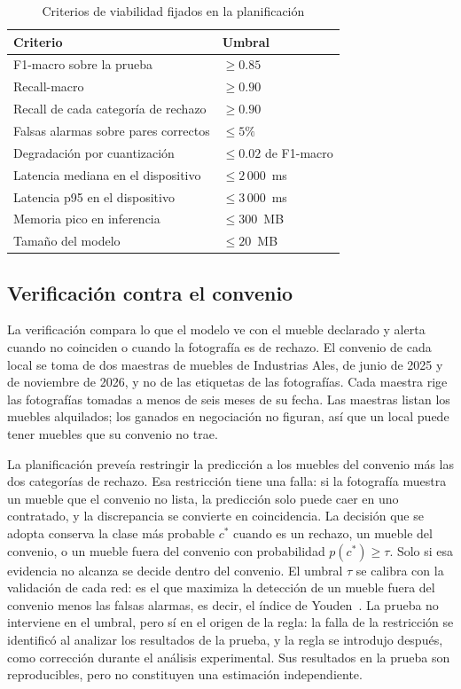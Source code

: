 \documentclass[conference]{IEEEtran}
\begin{document}
\begin{table}[t]
\caption{Criterios de viabilidad fijados en la planificación}
\label{tab:criterios}
\centering
\begin{tabular}{@{}ll@{}}
\toprule
Criterio & Umbral \\
\midrule
F1-macro sobre la prueba & $\geq 0.85$ \\
Recall-macro & $\geq 0.90$ \\
Recall de cada categoría de rechazo & $\geq 0.90$ \\
Falsas alarmas sobre pares correctos & $\leq 5\%$ \\
Degradación por cuantización & $\leq 0.02$ de F1-macro \\
Latencia mediana en el dispositivo & $\leq 2\,000$~ms \\
Latencia p95 en el dispositivo & $\leq 3\,000$~ms \\
Memoria pico en inferencia & $\leq 300$~MB \\
Tamaño del modelo & $\leq 20$~MB \\
\bottomrule
\end{tabular}
\end{table}

\subsection{Verificación contra el convenio}
\label{sec:decision}

La verificación compara lo que el modelo ve con el mueble declarado y alerta cuando no coinciden o cuando la
fotografía es de rechazo. El convenio de cada local se toma de dos maestras de muebles de Industrias Ales, de junio
de 2025 y de noviembre de 2026, y no de las etiquetas de las fotografías. Cada maestra rige las fotografías tomadas
a menos de seis meses de su fecha. Las maestras listan los muebles alquilados; los ganados en negociación no
figuran, así que un local puede tener muebles que su convenio no trae.

La planificación preveía restringir la predicción a los muebles del convenio más las dos categorías de rechazo.
Esa restricción tiene una falla: si la fotografía muestra un mueble que el convenio no lista, la predicción solo
puede caer en uno contratado, y la discrepancia se convierte en coincidencia. La decisión que se adopta conserva
la clase más probable $c^*$ cuando es un rechazo, un mueble del convenio, o un mueble fuera del convenio con
probabilidad $p(c^*) \geq \tau$. Solo si esa evidencia no alcanza se decide dentro del convenio. El umbral $\tau$
se calibra con la validación de cada red: es el que maximiza la detección de un mueble fuera del convenio menos
las falsas alarmas, es decir, el índice de Youden~\cite{youden1950}. La prueba no interviene en el umbral, pero sí
en el origen de la regla: la falla de la restricción se identificó al analizar los resultados de la prueba, y la
regla se introdujo después, como corrección durante el análisis experimental. Sus resultados en la prueba son
reproducibles, pero no constituyen una estimación independiente.
\end{document}
